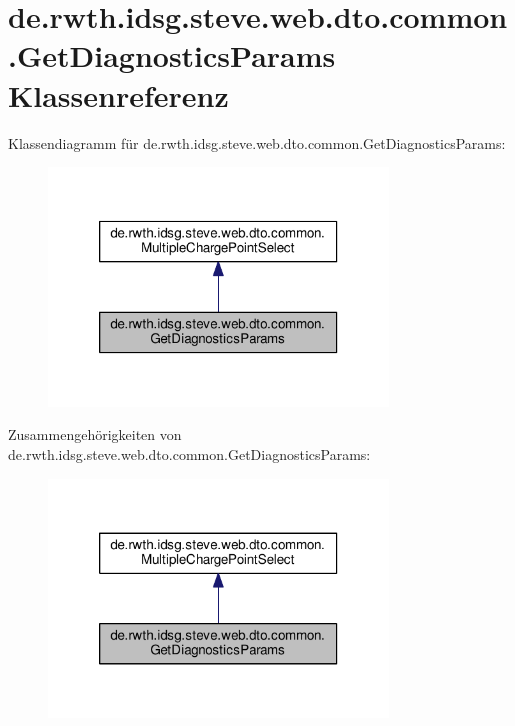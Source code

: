 \hypertarget{classde_1_1rwth_1_1idsg_1_1steve_1_1web_1_1dto_1_1common_1_1_get_diagnostics_params}{\section{de.\-rwth.\-idsg.\-steve.\-web.\-dto.\-common.\-Get\-Diagnostics\-Params Klassenreferenz}
\label{classde_1_1rwth_1_1idsg_1_1steve_1_1web_1_1dto_1_1common_1_1_get_diagnostics_params}
}


Klassendiagramm für de.\-rwth.\-idsg.\-steve.\-web.\-dto.\-common.\-Get\-Diagnostics\-Params\-:
\nopagebreak
\begin{figure}[H]
\begin{center}
\leavevmode
\includegraphics[width=256pt]{classde_1_1rwth_1_1idsg_1_1steve_1_1web_1_1dto_1_1common_1_1_get_diagnostics_params__inherit__graph}
\end{center}
\end{figure}


Zusammengehörigkeiten von de.\-rwth.\-idsg.\-steve.\-web.\-dto.\-common.\-Get\-Diagnostics\-Params\-:
\nopagebreak
\begin{figure}[H]
\begin{center}
\leavevmode
\includegraphics[width=256pt]{classde_1_1rwth_1_1idsg_1_1steve_1_1web_1_1dto_1_1common_1_1_get_diagnostics_params__coll__graph}
\end{center}
\end{figure}
